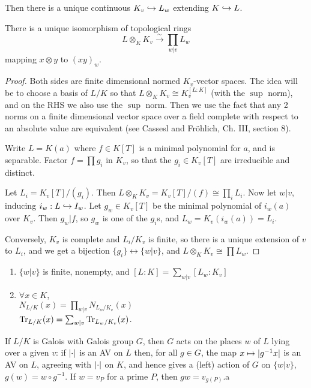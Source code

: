 \documentclass[10pt,a4paper]{article}
\begin{document}
Then there is a unique continuous $K_v\hookrightarrow L_w$ extending $K \hookrightarrow L$.
\begin{proposition}
  There is a unique isomorphism of topological rings
  \[L \otimes_K K_v \xrightarrow{\sim} \prod_{w|v}L_w\]
  mapping $x \otimes y$ to $(xy)_w$.
\end{proposition}
\begin{proof}
  Both sides are finite dimensional normed $K_v$-vector spaces. The idea will be to choose a basis of $L/K$ so that $L \otimes_K K_v \cong K_v^{[L:K]}$ (with the $\sup$ norm), and on the RHS we also use the $\sup$ norm. Then we use the fact that any 2 norms on a finite dimensional vector space over a field complete with respect to an absolute value are equivalent (see Cassesl and Fr\"ohlich, Ch. III, section 8).

  Write $L = K(a)$ where $f \in K[T]$ is a minimal polynomial for $a$, and is separable. Factor $f = \prod g_i$ in $K_v$, so that the $g_i \in K_v[T]$ are irreducible and distinct.

  Let $L_i = K_v[T]/(g_i)$. Then $L \otimes_K K_v = K_v[T]/(f) \cong \prod_i L_i$. Now let $w|v$, inducing $i_w:L \hookrightarrow I_w$. Let $g_w \in K_v[T]$ be the minimal polynomial of $i_w(a)$ over $K_v$. Then $g_w|f$, so $g_w$ is one of the $g_i$s, and $L_w = K_v(i_w(a)) = L_i$.

  Conversely, $K_v$ is complete and $L_i/K_v$ is finite, so there is a unique extension of $v$ to $L_i$, and we get a bijection $\{g_i\}\leftrightarrow \{w|v\}$, and $L\otimes_K K_v \cong \prod L_w$.
\end{proof}
\begin{corollary}\hspace*{0cm}
  \begin{enumerate}
    \item $\{w|v\}$ is finite, nonempty, and $[L:K] = \sum_{w|v} [L_w:K_v]$
    \item $\forall x \in K$, \\$N_{L/K}(x) = \prod_{w|v}N_{L_w/K_v}(x)$\\
    $\operatorname{Tr}_{L/K}(x) = \sum_{w|v}\operatorname{Tr}_{L_w/K_v}(x)$.
  \end{enumerate}
\end{corollary}
If $L/K$ is Galois with Galois group $G$, then $G$ acts on the places $w$ of $L$ lying over a given $v$: if $\lvert\cdot\rvert$ is an AV on $L$ then, for all $g \in G$, the map $x\mapsto \lvert g^{-1}x\rvert$ is an AV on $L$, agreeing with $\lvert\cdot\rvert$ on $K$, and hence gives a (left) action of $G$ on $\{w|v\}$, $g(w) = w \circ g^{-1}$. If $w=v_P$ for a prime $P$, then $gw = v_{g(P)}$.a
\end{document}
